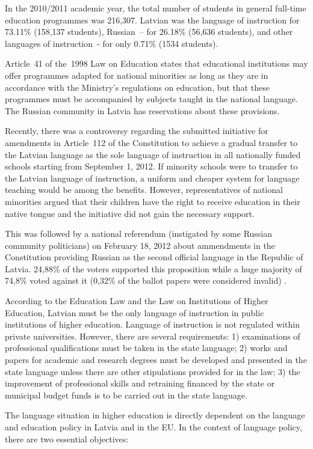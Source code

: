 \begin{multicols}{2}
In the 2010/2011 academic year, the total number of students in general full-time education programmes was 216,307.
Latvian was the language of instruction for 73.11\% (158,137 students), Russian~-- for 26.18\% (56,636 students), and other languages of instruction~- for only 0.71\% (1534 students).

Article~41 of the~1998 Law on Education states that educational institutions may offer programmes adapted for national minorities as long as they are in accordance with the Ministry's regulations on education, but that these programmes must be accompanied by subjects taught in the national language.
The Russian community in Latvia has reservations about these provisions.

Recently, there was a controversy regarding the submitted initiative for amendments in Article~112 of the Constitution to achieve a gradual transfer to the Latvian language as the sole language of instruction in all nationally funded schools starting from September 1, 2012.
If minority schools were to transfer to the Latvian language of instruction, a uniform and cheaper system for language teaching would be among the benefits.
However, representatives of national minorities argued that their children have the right to receive education in their native tongue and the initiative did not gain the necessary support.

This was followed by a national referendum (instigated by some Russian community politicians) on February 18, 2012 about ammendments in the Constitution providing Russian as the second official language in the Republic of Latvia. 
24,88\% of the voters supported this proposition while a huge majority of 74,8\% voted against it (0,32\% of the ballot papers were considered invalid) \cite{Meta56}.

According to the Education Law and the Law on Institutions of Higher Education, Latvian must be the only language of instruction in public institutions of higher education.
Language of instruction is not regulated within private universities.
However, there are several requirements: 1) examinations of professional qualifications must be taken in the state language; 2) works and papers for academic and research degrees must be developed and presented in the state language unless there are other stipulations provided for in the law; 3) the improvement of professional skills and retraining financed by the state or municipal budget funds is to be carried out in the state language.

The language situation in higher education is directly dependent on the language and education policy in Latvia and in the EU.
In the context of language policy, there are two essential objectives:


\end{multicols}
